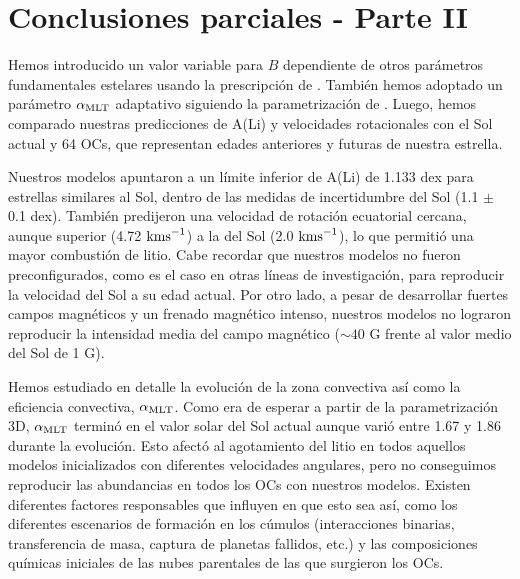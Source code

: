 \section{Conclusiones parciales - Parte II} \label{sec_conclusions_ii}
Hemos introducido un valor variable para $B$ dependiente de otros parámetros fundamentales estelares usando la prescripción de \citet{Gallet2013}. También hemos adoptado un parámetro $\alpha_{\mathrm{MLT}}$ adaptativo siguiendo la parametrización de \citet{Sonoi2018}. Luego, hemos comparado nuestras predicciones de A(Li) y velocidades rotacionales con el Sol actual y 64 OCs, que representan edades anteriores y futuras de nuestra estrella.\par

Nuestros modelos apuntaron a un límite inferior de A(Li) de 1.133 dex para estrellas similares al Sol, dentro de las medidas de incertidumbre del Sol (1.1 $\pm$ 0.1 dex). También predijeron una velocidad de rotación ecuatorial cercana, aunque superior (4.72 $\mathrm{kms}^{-1}$) a la del Sol (2.0 $\mathrm{kms}^{-1}$), lo que permitió una mayor combustión de litio. Cabe recordar que nuestros modelos no fueron preconfigurados, como es el caso en otras líneas de investigación, para reproducir la velocidad del Sol a su edad actual. Por otro lado, a pesar de desarrollar fuertes campos magnéticos y un frenado magnético intenso, nuestros modelos no lograron reproducir la intensidad media del campo magnético ($\sim 40$ G frente al valor medio del Sol de 1 G).\par

Hemos estudiado en detalle la evolución de la zona convectiva así como la eficiencia convectiva, $\alpha_{\mathrm{MLT}}$. Como era de esperar a partir de la parametrización 3D, $\alpha_{\mathrm{MLT}}$ terminó en el valor solar del Sol actual aunque varió entre 1.67 y 1.86 durante la evolución. Esto afectó al agotamiento del litio en todos aquellos modelos inicializados con diferentes velocidades angulares, pero no conseguimos reproducir las abundancias en todos los OCs con nuestros modelos. Existen diferentes factores responsables que influyen en que esto sea así, como los diferentes escenarios de formación en los cúmulos (interacciones binarias, transferencia de masa, captura de planetas fallidos, etc.) y las composiciones químicas iniciales de las nubes parentales de las que surgieron los OCs.\par

\endinput

